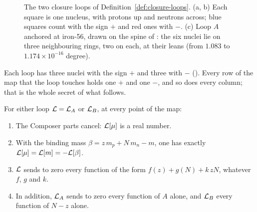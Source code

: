 \begin{figure}[tb]
\caption[The two closure loops]{The two closure loops of Definition~\ref{def:closure-loops}. (a, b) Each square is one nucleus, with protons up and neutrons across; blue squares count with the sign $+$ and red ones with $-$. (c) Loop $A$ anchored at iron-56, drawn on the spine of : the six nuclei lie on three neighbouring rings, two on each, at their leans (from $1.083$ to $1.174 \times 10^{-16}$ degree).}
\label{fig:cl-loops}
\end{figure}

Each loop has three nuclei with the sign $+$ and three with $-$ (). Every row of the map that the loop touches holds one $+$ and one $-$, and so does every column; that is the whole secret of what follows.

\begin{theorem}\label{thm:exact-closure}
For either loop $\mathcal{L} = \mathcal{L}_A$ or $\mathcal{L}_B$, at every point of the map:
\begin{enumerate}
  \item The Composer parts cancel: $\mathcal{L}[\mu]$ is a real number.
  \item With the binding mass $\beta = z\,m_p + N\,m_n - m$, one has exactly $\mathcal{L}[\mu] = \mathcal{L}[m] = -\mathcal{L}[\beta]$.
  \item $\mathcal{L}$ sends to zero every function of the form $f(z) + g(N) + k\,zN$, whatever $f$, $g$ and $k$.
  \item In addition, $\mathcal{L}_A$ sends to zero every function of $A$ alone, and $\mathcal{L}_B$ every function of $N - z$ alone.
\end{enumerate}
\end{theorem}

